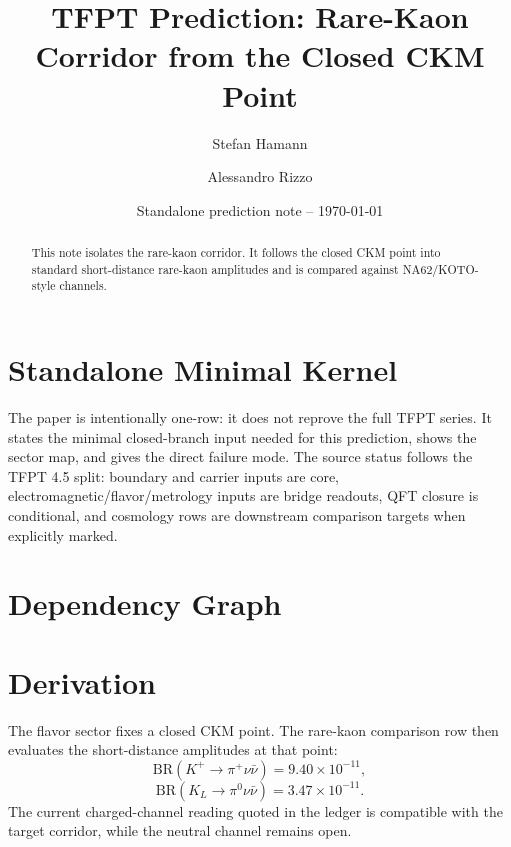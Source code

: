 \documentclass[11pt,a4paper]{article}
\title{\color{tfptblue}\textbf{TFPT Prediction: Rare-Kaon Corridor from the Closed CKM Point}}
\author{Stefan Hamann \and Alessandro Rizzo}
\date{{\normalsize\color{tfptgray}\sffamily Standalone prediction note -- \today}}
\begin{document}
\maketitle

\begin{abstract}
This note isolates the rare-kaon corridor. It follows the closed CKM point into standard short-distance rare-kaon amplitudes and is compared against NA62/KOTO-style channels.
\end{abstract}



\section{Standalone Minimal Kernel}
\MinimalKernelBox

The paper is intentionally one-row: it does not reprove the full TFPT series. It states the minimal closed-branch input needed for this prediction, shows the sector map, and gives the direct failure mode. The source status follows the TFPT 4.5 split: boundary and carrier inputs are core, electromagnetic/flavor/metrology inputs are bridge readouts, QFT closure is conditional, and cosmology rows are downstream comparison targets when explicitly marked.


\section{Dependency Graph}

\section{Derivation}

The flavor sector fixes a closed CKM point. The rare-kaon comparison row then evaluates the short-distance amplitudes at that point:
\[
\mathrm{BR}(K^+\to\pi^+\nu\bar\nu)=9.40\times10^{-11},
\]
\[
\mathrm{BR}(K_L\to\pi^0\nu\bar\nu)=3.47\times10^{-11}.
\]
The current charged-channel reading quoted in the ledger is compatible with the target corridor, while the neutral channel remains open.
\end{document}
